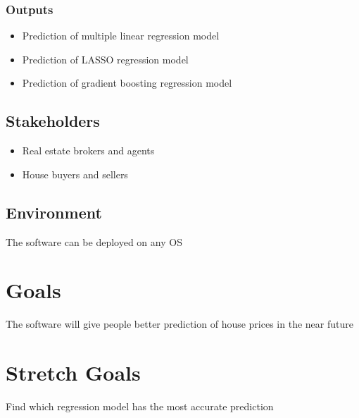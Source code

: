 \documentclass{article}
\begin{document}
\subsubsection{Outputs}
\begin{itemize}
    \item Prediction of multiple linear regression model
    \item Prediction of LASSO regression model
    \item Prediction of gradient boosting regression model
\end{itemize}

\subsection{Stakeholders}
\begin{itemize}
    \item Real estate brokers and agents
    \item House buyers and sellers
\end{itemize}

\subsection{Environment}
The software can be deployed on any OS

\section{Goals}
The software will give people better prediction of house prices in the near future

\section{Stretch Goals}
Find which regression model has the most accurate prediction
\end{document}
